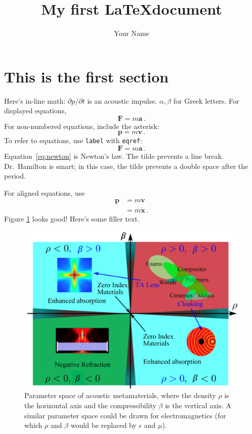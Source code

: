 \documentclass[12pt]{article}
\title{My first \LaTeX \space document}
\author{Your Name}
\renewcommand{\vec}[1]{\mathbf{#1}} %
\begin{document}
\maketitle

\section{This is the first section}
Here's in-line math: \(\partial p/\partial t\) is an acoustic impulse. \(\alpha, \beta\) for Greek letters. For displayed equations,
\begin{equation}
\vec{F} = m\vec{a}\,.
\end{equation}
For non-numbered equations, include the asterisk: 
\begin{equation*}
\vec{p} = m\vec{v}\,.
\end{equation*}
To refer to equations, use \texttt{label} with \texttt{eqref}:
\begin{equation}\label{eq:newton}
\vec{F} = m\vec{a}\,.
\end{equation}
Equation~\eqref{eq:newton} is Newton's law. The tilde prevents a line break. Dr.~Hamilton is smart; in this case, the tilde prevents a double space after the period. 

For aligned equations, use  
\begin{align*}
\vec{p} &= m\vec{v}\\
&= m\dot{\vec{x}}\,.
\end{align*}
Figure \ref{fig:ashby} looks good! Here's some filler text.
\lipsum
\begin{figure}%
\centering\includegraphics[width=0.5\linewidth]{fig/ashby}
\caption{Parameter space of acoustic metamaterials, where the density \(\rho\) is the horizontal axis and the compressibility \(\beta\) is the vertical axis. A similar parameter space could be drawn for electromagnetics (for which \(\rho\) and \(\beta\) would be replaced by \(\epsilon\) and \(\mu\)).} \label{fig:ashby}
\end{figure}
\end{document}
